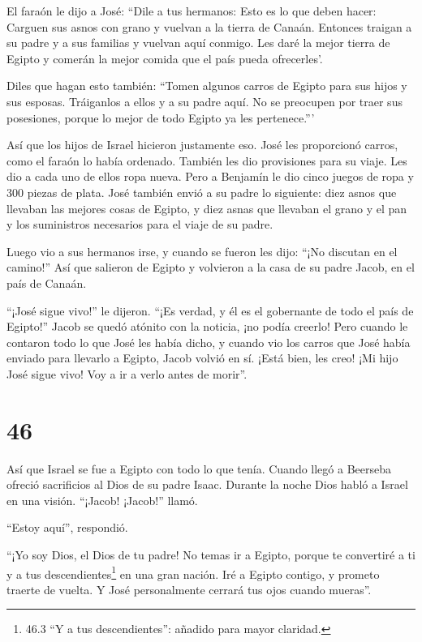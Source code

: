  El faraón le dijo a José: ``Dile a tus hermanos: Esto es
lo que deben hacer: Carguen sus asnos con grano y vuelvan a la tierra de
Canaán.  Entonces traigan a su padre y a sus familias y
vuelvan aquí conmigo. Les daré la mejor tierra de Egipto y comerán la
mejor comida que el país pueda ofrecerles'.

 Diles que hagan esto también: ``Tomen algunos carros de
Egipto para sus hijos y sus esposas. Tráiganlos a ellos y a su padre
aquí.  No se preocupen por traer sus posesiones, porque lo
mejor de todo Egipto ya les pertenece.'''

 Así que los hijos de Israel hicieron justamente eso. José
les proporcionó carros, como el faraón lo había ordenado. También les
dio provisiones para su viaje.  Les dio a cada uno de ellos
ropa nueva. Pero a Benjamín le dio cinco juegos de ropa y 300 piezas de
plata.  José también envió a su padre lo siguiente: diez
asnos que llevaban las mejores cosas de Egipto, y diez asnas que
llevaban el grano y el pan y los suministros necesarios para el viaje de
su padre.

 Luego vio a sus hermanos irse, y cuando se fueron les
dijo: ``¡No discutan en el camino!''  Así que salieron de
Egipto y volvieron a la casa de su padre Jacob, en el país de Canaán.

 ``¡José sigue vivo!'' le dijeron. ``¡Es verdad, y él es el
gobernante de todo el país de Egipto!'' Jacob se quedó atónito con la
noticia, ¡no podía creerlo!  Pero cuando le contaron todo
lo que José les había dicho, y cuando vio los carros que José había
enviado para llevarlo a Egipto, Jacob volvió en sí.  ¡Está
bien, les creo! ¡Mi hijo José sigue vivo! Voy a ir a verlo antes de
morir''.

\hypertarget{section-45}{%
\section{46}\label{section-45}}

 Así que Israel se fue a Egipto con todo lo que tenía.
Cuando llegó a Beerseba ofreció sacrificios al Dios de su padre Isaac.
 Durante la noche Dios habló a Israel en una visión.
``¡Jacob! ¡Jacob!'' llamó.

``Estoy aquí'', respondió.

 ``¡Yo soy Dios, el Dios de tu padre! No temas ir a Egipto,
porque te convertiré a ti y a tus descendientes\footnote{46.3 ``Y a tus
  descendientes'': añadido para mayor claridad.} en una gran nación.
 Iré a Egipto contigo, y prometo traerte de vuelta. Y José
personalmente cerrará tus ojos cuando mueras''.

